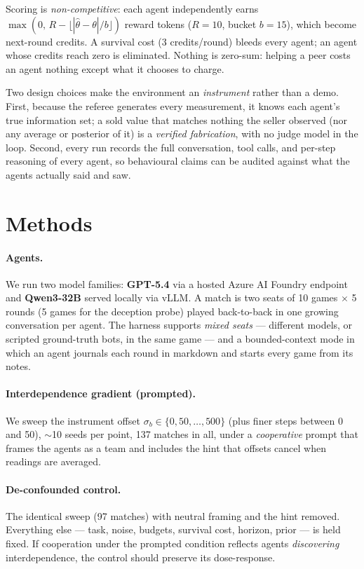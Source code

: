 \documentclass[11pt]{article}
\begin{document}
Scoring is \emph{non-competitive}: each agent independently earns
$\max(0,\, R - \lfloor |\hat\theta - \theta| / b \rfloor)$ reward tokens
($R{=}10$, bucket $b{=}15$), which become next-round credits. A survival cost
(3 credits/round) bleeds every agent; an agent whose credits reach zero is
eliminated. Nothing is zero-sum: helping a peer costs an agent nothing except
what it chooses to charge.

Two design choices make the environment an \emph{instrument} rather than a
demo. First, because the referee generates every measurement, it knows each
agent's true information set; a sold value that matches nothing the seller
observed (nor any average or posterior of it) is a \emph{verified
fabrication}, with no judge model in the loop. Second, every run records the
full conversation, tool calls, and per-step reasoning of every agent, so
behavioural claims can be audited against what the agents actually said and
saw.

\section{Methods}
\label{sec:methods}

\paragraph{Agents.} We run two model families: \textbf{GPT-5.4} via a hosted
Azure AI Foundry endpoint and \textbf{Qwen3-32B} \citep{qwen3} served locally
via vLLM. A match is two seats of 10 games $\times$ 5 rounds (5 games for the
deception probe) played back-to-back in one growing conversation per agent. The
harness supports \emph{mixed seats} --- different models, or scripted
ground-truth bots, in the same game --- and a bounded-context mode in which an
agent journals each round in markdown and starts every game from its notes.

\paragraph{Interdependence gradient (prompted).} We sweep the instrument
offset $\sigma_b \in \{0, 50, \dots, 500\}$ (plus finer steps between 0 and
50), $\sim$10 seeds per point, 137 matches in all, under a
\emph{cooperative} prompt that frames the agents as a team and includes the
hint that offsets cancel when readings are averaged.

\paragraph{De-confounded control.} The identical sweep (97 matches) with
neutral framing and the hint removed. Everything else --- task, noise,
budgets, survival cost, horizon, prior --- is held fixed. If cooperation under
the prompted condition reflects agents \emph{discovering} interdependence,
the control should preserve its dose-response.
\end{document}
